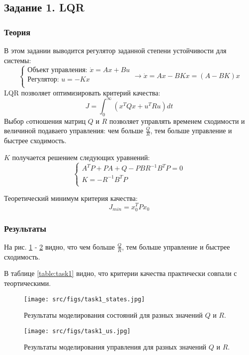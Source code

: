 \subsection{Задание 1. LQR}
\subsubsection{Теория}
В этом задании выводится регулятор заданной степени устойчивости для системы:
\[
        \begin{cases}
                \text{Объект управления: }\dot{x} = A x + Bu \\
                \text{Регулятор: }u = -K x \\
        \end{cases} \rightarrow
        \dot{x} = A x - BKx = (A-BK)x
\]
LQR позволяет оптимизировать критерий качества:
\[J = \int_0^\infty (x^T Q x + u^T R u)dt \]
Выбор cотношения матриц \(Q\) и \(R\) позволяет управлять временем сходимости и величиной подаваего управления: чем больше \(\frac{Q}{R}\), тем больше управление и быстрее сходимость.

\(K\) получается решением следующих уравнений:
\[
\begin{cases}
    A^T P + P A + Q - PBR^{-1}B^TP = 0\\
    K = -R^{-1} B^T P \\
\end{cases}
\]

Теоретический минимум критерия качества:
\[J_{min} = x_0^T P x_0\]

\subsubsection{Результаты}
На рис. \ref{fig:task1_states} - \ref{fig:task1_us} видно, что чем больше \(\frac{Q}{R}\), тем больше управление и быстрее сходимость.

В таблице \ref{table:task1} видно, что критерии качества практически совпали с теортическими.
\begin{figure}[ht!]
        \centering
        \texttt{[image: src/figs/task1\_states.jpg]}
        \caption{Результаты моделирования состояний для разных значений \(Q\) и \(R\).}
        \label{fig:task1_states}
\end{figure}

\begin{figure}[ht!]
        \centering
        \texttt{[image: src/figs/task1\_us.jpg]}
        \caption{Результаты моделирования управления для разных значений \(Q\) и \(R\).}
        \label{fig:task1_us}
\end{figure}

